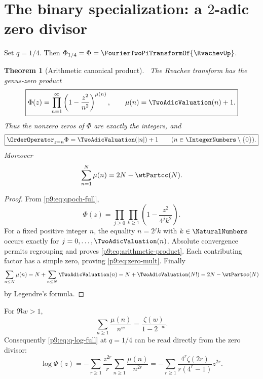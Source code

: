 \documentclass[11pt]{article}
\numberwithin{equation}{section}
\newtheorem{theorem}{Theorem}[section]
\theoremstyle{definition}
\theoremstyle{remark}
\begin{document}
\section{The binary specialization: a $2$-adic zero divisor}
\label{p9:sec:zero-divisor}

Set $q=1/4$.  Then $\Phi_{1/4}=\Phi=\FourierTwoPiTransformOf{\RvachevUp}$.

\begin{theorem}[Arithmetic canonical product]\label{p9:thm:arithmetic-product}
\statusN\ The Rvachev transform has the genus-zero product
\begin{equation}
 \boxed{
 \Phi(z)=\prod_{n=1}^{\infty}\left(1-\frac{z^2}{n^2}\right)^{\mu(n)},
 \qquad \mu(n)=\TwoAdicValuation(n)+1.}                                \label{p9:eq:arithmetic-product}
\end{equation}
Thus the nonzero zeros of $\Phi$ are exactly the integers, and
\begin{equation}
 \boxed{\OrderOperator_{z=n}\Phi=\TwoAdicValuation(|n|)+1\qquad(n\in\IntegerNumbers\setminus\{0\}).} \label{p9:eq:zero-mult}
\end{equation}
Moreover
\begin{equation}
 \sum_{n=1}^{N}\mu(n)=2N-\wtPartcc(N).                           \label{p9:eq:zero-count}
\end{equation}
\end{theorem}

\begin{proof}
From \eqref{p9:eq:qpoch-full},
\[
 \Phi(z)=\prod_{j\ge0}\prod_{k\ge1}
 \left(1-\frac{z^2}{4^jk^2}\right).
\]
For a fixed positive integer $n$, the equality $n=2^jk$ with $k\in\NaturalNumbers$ occurs exactly for
$j=0,\ldots,\TwoAdicValuation(n)$.  Absolute convergence permits regrouping and proves
\eqref{p9:eq:arithmetic-product}.  Each contributing factor has a simple zero, proving
\eqref{p9:eq:zero-mult}.  Finally
\[
 \sum_{n\le N}\mu(n)=N+\sum_{n\le N}\TwoAdicValuation(n)
 =N+\TwoAdicValuation(N!)=2N-\wtPartcc(N)
\]
by Legendre's formula.
\end{proof}

\begin{corollary}\label{p9:cor:mu-Dirichlet}
For $\Re w>1$,
\begin{equation}
 \boxed{\sum_{n\ge1}\frac{\mu(n)}{n^w}
 =\frac{\zeta(w)}{1-2^{-w}}.}                              \label{p9:eq:mu-Dirichlet}
\end{equation}
Consequently \eqref{p9:eq:q-log-full} at $q=1/4$ can be read directly from the zero divisor:
\begin{equation}
 \log\Phi(z)=-\sum_{r\ge1}\frac{z^{2r}}r
 \sum_{n\ge1}\frac{\mu(n)}{n^{2r}}
 =-\sum_{r\ge1}\frac{4^r\zeta(2r)}{r(4^r-1)}z^{2r}.      \label{p9:eq:logPhi-mu}
\end{equation}
\end{corollary}
\end{document}
